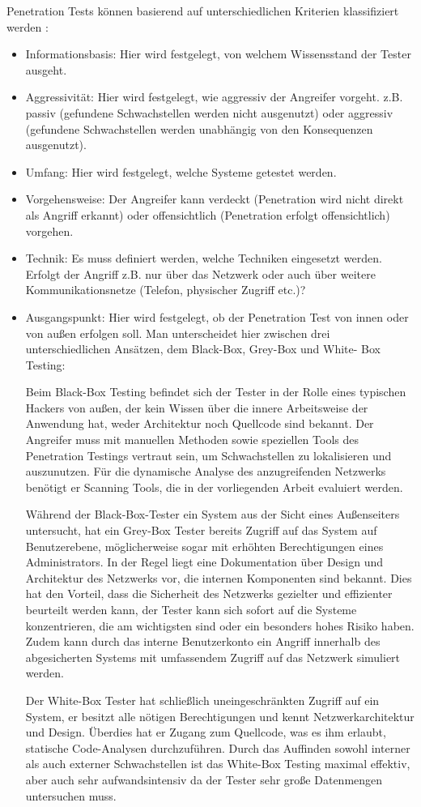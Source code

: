 \documentclass[12pt,oneside,a4paper,parskip]{scrbook}
\begin{document}
    Penetration Tests können basierend auf unterschiedlichen Kriterien klassifiziert werden \cite{BSI}:
    \begin{itemize}
      \item Informationsbasis: Hier wird festgelegt, von welchem Wissensstand der Tester ausgeht.
      \item Aggressivität: Hier wird festgelegt, wie aggressiv der Angreifer vorgeht. z.B. passiv (gefundene
      Schwachstellen werden nicht ausgenutzt) oder aggressiv (gefundene Schwachstellen werden
      unabhängig von den Konsequenzen ausgenutzt).
      \item Umfang: Hier wird festgelegt, welche Systeme getestet werden.
      \item Vorgehensweise: Der Angreifer kann verdeckt (Penetration wird nicht direkt als Angriff erkannt)
      oder offensichtlich (Penetration erfolgt offensichtlich) vorgehen.
      \item Technik: Es muss definiert werden, welche Techniken eingesetzt werden. Erfolgt der Angriff z.B. nur
      über das Netzwerk oder auch über weitere Kommunikationsnetze (Telefon, physischer Zugriff etc.)?
      \item Ausgangspunkt: Hier wird festgelegt, ob der Penetration Test von innen oder von außen erfolgen
      soll. Man unterscheidet hier zwischen drei unterschiedlichen Ansätzen, dem Black-Box, Grey-Box und White- Box Testing:

    Beim Black-Box Testing befindet sich der Tester in der Rolle eines typischen Hackers von
    außen, der kein Wissen über die innere Arbeitsweise der Anwendung hat, weder Architektur noch
    Quellcode sind bekannt. Der Angreifer muss mit manuellen Methoden sowie speziellen Tools des Penetration Testings vertraut sein, um Schwachstellen zu lokalisieren und auszunutzen. Für die dynamische Analyse des anzugreifenden Netzwerks benötigt er Scanning Tools, die in der vorliegenden Arbeit evaluiert werden.

    Während der Black-Box-Tester ein System aus der Sicht eines Außenseiters untersucht, hat ein    Grey-Box Tester bereits Zugriff auf das System auf Benutzerebene, möglicherweise sogar mit erhöhten Berechtigungen eines Administrators. In der Regel liegt eine Dokumentation über Design und Architektur des Netzwerks vor, die internen Komponenten sind bekannt. Dies hat den Vorteil, dass die Sicherheit des Netzwerks gezielter und effizienter beurteilt werden kann, der Tester kann sich sofort auf die Systeme konzentrieren, die am wichtigsten sind oder ein besonders hohes Risiko haben. Zudem kann durch das interne Benutzerkonto ein Angriff innerhalb des abgesicherten Systems mit umfassendem Zugriff auf das Netzwerk simuliert werden.

    Der White-Box Tester hat schließlich uneingeschränkten Zugriff auf ein System, er besitzt alle nötigen Berechtigungen und kennt Netzwerkarchitektur und Design. Überdies hat er Zugang zum Quellcode, was es ihm erlaubt, statische Code-Analysen durchzuführen. Durch das Auffinden sowohl interner als auch externer Schwachstellen ist das White-Box Testing maximal effektiv, aber auch sehr aufwandsintensiv da der Tester sehr große Datenmengen untersuchen muss.
    \end{itemize}
\end{document}
